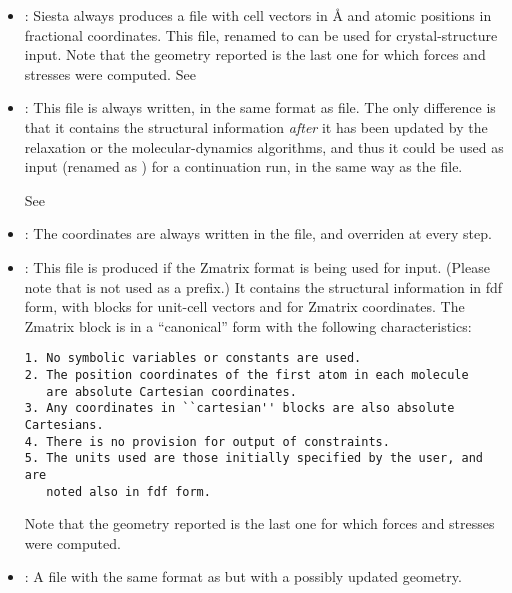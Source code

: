 \begin{itemize}

  \item{}:%
  Siesta always produces a  file with cell
  vectors in {\AA} and atomic positions in fractional
  coordinates. This file, renamed to  can be used
  for crystal-structure input.  Note that the geometry reported is the
  last one for which forces and stresses were computed.  See
  
  \item{}:%
  This file is always written, in the same format as
   file. The only difference is that it contains
  the structural information \emph{after} it has been updated by the
  relaxation or the molecular-dynamics algorithms, and thus it could
  be used as input (renamed as ) for a
  continuation run, in the same way as the  file.
  
  See 

  \item{}:%
  The coordinates are always written in the  file, and
  overriden at every step.
  
  \item{}:%
  This file is produced if the Zmatrix format is being used for
  input. (Please note that  is not used as a
  prefix.)  It contains the structural information in fdf form, with
  blocks for unit-cell vectors and for Zmatrix coordinates. The
  Zmatrix block is in a ``canonical'' form with the following
  characteristics:

\begin{verbatim}
1. No symbolic variables or constants are used.
2. The position coordinates of the first atom in each molecule
   are absolute Cartesian coordinates.
3. Any coordinates in ``cartesian'' blocks are also absolute Cartesians.
4. There is no provision for output of constraints.
5. The units used are those initially specified by the user, and are
   noted also in fdf form.
\end{verbatim}

  Note that the geometry reported is the last one for which forces and
  stresses were computed.

  \item{}:%
  A file with the same format as  but with
  a possibly updated geometry.
  

\end{itemize}
